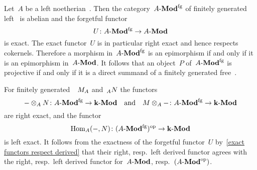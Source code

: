 \begin{remark}
  Let~$A$ be a left noetherian~{\kalg}.
  Then the category~$\text{$A$-$\mathbf{Mod}^{\mathrm{fg}}$}$ of finitely generated left~{} is abelian and the forgetful functor
  \[
    U
    \colon
    \text{$A$-$\mathbf{Mod}^{\mathrm{fg}}$}
    \to
    \text{$A$-$\mathbf{Mod}$}
  \]
  is exact.
  The exact functor~$U$ is in particular right exact and hence respects cokernels.
  Therefore a morphism in~$\text{$A$-$\mathbf{Mod}^{\mathrm{fg}}$}$ is an epimorphism if and only if it is an epimorphism in~$\text{$A$-$\mathbf{Mod}$}$.
  It follows that an object~$P$ of~$\text{$A$-$\mathbf{Mod}^{\mathrm{fg}}$}$ is projective if and only if it is a direct summand of a finitely 
  generated free~{}.
  
  For finitely generated~{}~$\indmodule{M}[A]$ and~$\indmodule[A]{N}$ the functors
  \[
    - \otimes_A N
    \colon
    \text{$A$-$\mathbf{Mod}^{\mathrm{fg}}$}
    \to
    \text{$\mathbf{k}$-$\mathbf{Mod}$}
    \quad\text{and}\quad
    M \otimes_A -
    \colon
    \text{$A$-$\mathbf{Mod}^{\mathrm{fg}}$}
    \to
    \text{$\mathbf{k}$-$\mathbf{Mod}$}
  \]
  are right exact, and the functor
  \[
    \operatorname{Hom}_A(-,N)
    \colon
    (\text{$A$-$\mathbf{Mod}^{\mathrm{fg}}$})^{\mathrm{op}}
    \to
    \text{$\mathbf{k}$-$\mathbf{Mod}$}
  \]
  is left exact.
  It follows from the exactness of the forgetful functor~$U$ by~\cref{exact functors respect derived} that their right, resp.\ left derived functor agrees with the right, resp.\ left derived functor for~$\text{$A$-$\mathbf{Mod}$}$, resp.~$(\text{$A$-$\mathbf{Mod}$}^{\mathrm{op}})$.
\end{remark}







